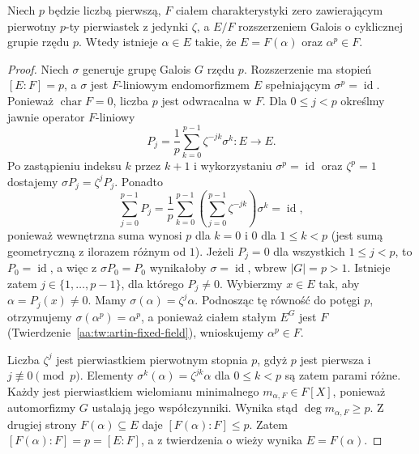 \begin{lemat}
\label{aa:lem:kummer-cyclic-prime}
Niech $p$ będzie liczbą pierwszą, $F$ ciałem
charakterystyki zero zawierającym pierwotny $p$-ty
pierwiastek z jedynki $\zeta$, a $E/F$ rozszerzeniem
Galois o cyklicznej grupie rzędu $p$.
Wtedy istnieje $\alpha\in E$ takie, że
$E=F(\alpha)$ oraz $\alpha^p\in F$.
\end{lemat}
\begin{proof}
Niech $\sigma$ generuje grupę Galois $G$ rzędu $p$.
Rozszerzenie ma stopień $[E:F]=p$, a $\sigma$ jest
$F$-liniowym endomorfizmem $E$ spełniającym
$\sigma^p=\operatorname{id}$. Ponieważ $\operatorname{char}F=0$,
liczba $p$ jest odwracalna w $F$. Dla $0\le j<p$ określmy
jawnie operator $F$-liniowy
\[
P_j=\frac1p\sum_{k=0}^{p-1}\zeta^{-jk}\sigma^k:E\longrightarrow E.
\]
Po zastąpieniu indeksu $k$ przez $k+1$ i wykorzystaniu
$\sigma^p=\operatorname{id}$ oraz $\zeta^p=1$ dostajemy
$\sigma P_j=\zeta^j P_j$. Ponadto
\[
\sum_{j=0}^{p-1}P_j
=\frac1p\sum_{k=0}^{p-1}\left(\sum_{j=0}^{p-1}\zeta^{-jk}\right)\sigma^k
=\operatorname{id},
\]
ponieważ wewnętrzna suma wynosi $p$ dla $k=0$
i $0$ dla $1\le k<p$ (jest sumą geometryczną
z ilorazem różnym od $1$). Jeżeli $P_j=0$ dla
wszystkich $1\le j<p$, to $P_0=\operatorname{id}$,
a więc z $\sigma P_0=P_0$ wynikałoby
$\sigma=\operatorname{id}$, wbrew $|G|=p>1$.
Istnieje zatem $j\in\{1,\ldots,p-1\}$, dla którego
$P_j\ne0$. Wybierzmy $x\in E$ tak, aby
$\alpha=P_j(x)\ne0$. Mamy $\sigma(\alpha)=\zeta^j\alpha$.
Podnosząc tę równość do potęgi $p$, otrzymujemy
$\sigma(\alpha^p)=\alpha^p$, a ponieważ ciałem stałym
$E^G$ jest $F$ (Twierdzenie~\ref{aa:tw:artin-fixed-field}),
wnioskujemy $\alpha^p\in F$.

Liczba $\zeta^j$ jest pierwiastkiem pierwotnym stopnia $p$,
gdyż $p$ jest pierwsza i $j\not\equiv0\pmod p$.
Elementy $\sigma^k(\alpha)=\zeta^{jk}\alpha$ dla
$0\le k<p$ są zatem parami różne.
Każdy jest pierwiastkiem wielomianu minimalnego
$m_{\alpha,F}\in F[X]$, ponieważ automorfizmy $G$
ustalają jego współczynniki. Wynika stąd
$\deg m_{\alpha,F}\ge p$. Z drugiej strony
$F(\alpha)\subseteq E$ daje $[F(\alpha):F]\le p$.
Zatem $[F(\alpha):F]=p=[E:F]$,
a z twierdzenia o wieży wynika $E=F(\alpha)$.
\end{proof}

